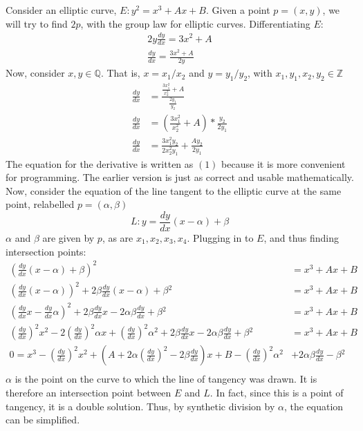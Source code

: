 \documentclass[12pt,letterpaper]{article}
\begin{document}
\raggedright
Consider an elliptic curve, $E: y^2=x^3+Ax+B$.
Given a point $p=(x,y)$, we will try to find $2p$, with the group law for elliptic curves.
Differentiating $E$:
\begin{align*}
 2y\frac{dy}{dx}=3x^2+A  \\
   \frac{dy}{dx}=\frac{3x^2+A}{2y}
\end{align*}
Now, consider $x,y\in\mathbb{Q}$. That is, $x=x_1/x_2$ and $y=y_1/y_2$, with $x_1,y_1,x_2,y_2\in\mathbb{Z}$
\begin{align*}
 \frac{dy}{dx}&=\frac{\frac{3x_1^2}{x_2^2}+A}{\frac{2y_1}{y_2}} \\
 \frac{dy}{dx}&=\left(\frac{3x_1^2}{x_2^2}+A\right)*\frac{y_2}{2y_1} \\
 \frac{dy}{dx}&=\frac{3x_1^2y_2}{2x_2^2y_1}+\frac{Ay_2}{2y_1} \tag{1}
\end{align*}\break
\break
The equation for the derivative is written as $(1)$ because it is more convenient for programming. The earlier version is just as correct and usable mathematically.\break\break
Now, consider the equation of the line tangent to the elliptic curve at the same point, relabelled $p=(\alpha,\beta)$
$$L:y=\frac{dy}{dx}(x-\alpha)+\beta$$
$\alpha$ and $\beta$ are given by $p$, as are $x_1,x_2,x_3,x_4$.
Plugging in to $E$, and thus finding intersection points:
\begin{align*}
 \left(\frac{dy}{dx}(x-\alpha)+\beta\right)^2&=x^3+Ax+B \\
 \left(\frac{dy}{dx}(x-\alpha)\right)^2+2\beta\frac{dy}{dx}(x-\alpha)+\beta{^2}&=x^3+Ax+B \\
 \left(\frac{dy}{dx}x-\frac{dy}{dx}\alpha\right)^2+2\beta\frac{dy}{dx}x-2\alpha\beta\frac{dy}{dx}+\beta{^2}&=x^3+Ax+B \\
 \left(\frac{dy}{dx}\right)^2 x^2-2\left(\frac{dy}{dx}\right)^2\alpha x+\left(\frac{dy}{dx}\right)^2\alpha{^2} +2\beta\frac{dy}{dx}x-2\alpha\beta\frac{dy}{dx}+\beta{^2}&=x^3+Ax+B \\
 0=x^3-\left(\frac{dy}{dx}\right)^2 x^2+\left(A+2\alpha\left(\frac{dy}{dx}\right)^2-2\beta\frac{dy}{dx}\right)x+B-\left(\frac{dy}{dx}\right)^2\alpha{^2} &+2\alpha\beta\frac{dy}{dx}-\beta{^2} \\
\end{align*}
$\alpha$ is the point on the curve to which the line of tangency was drawn. It is therefore an intersection point between $E$ and $L$. In fact, since this is a point of tangency, it is a double solution. Thus, by synthetic division by $\alpha$, the equation can be simplified.
\end{document}
